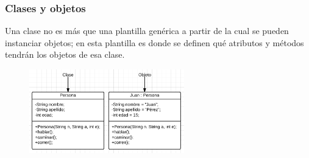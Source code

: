 \begin{frame}[fragile]
  \frametitle{Clases y objetos}
  
  Una clase no es m\'as que una plantilla gen\'erica a partir de la cual se pueden instanciar objetos;
  en esta plantilla es donde se definen qu\'e atributos y m\'etodos tendr\'an los objetos de esa clase.
  
  \begin{figure}
    \includegraphics[width=0.6\textwidth]{Imagenes/ClaseObjeto.jpg}
  \end{figure}
  
\end{frame}

